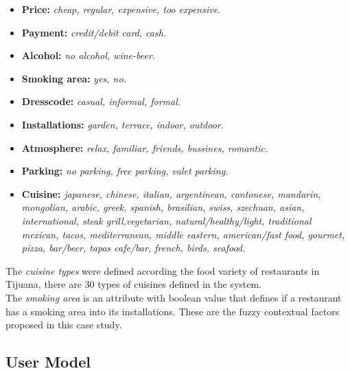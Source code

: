 \begin{itemize}
\item \textbf{Price:} \textit{cheap, regular, expensive, too expensive.}
\item \textbf{Payment:} \textit{credit/debit card, cash.}
\item \textbf{Alcohol:} \textit{no alcohol, wine-beer.}
\item \textbf{Smoking area:} \textit{yes, no.}
\item \textbf{Dresscode:} \textit{casual, informal, formal.}
\item \textbf{Installations:} \textit{garden, terrace, indoor, outdoor.}
\item \textbf{Atmosphere:} \textit{relax, familiar, friends, bussines, romantic.}
\item \textbf{Parking:} \textit{no parking, free parking, valet parking.}
\item \textbf{Cuisine:} \textit{japanese, chinese, italian, argentinean,
cantonese, mandarin, mongolian, arabic, greek, spanish, brasilian,
swiss, szechuan, asian, international, steak grill,vegetarian,
natural/healthy/light, traditional mexican, tacos, mediterranean,
middle eastern, american/fast food, gourmet, pizza, bar/beer, tapas
cafe/bar, french, birds, seafood.}
\end{itemize}
The \textit{cuisine types} were defined according the food variety 
of restaurants in Tijuana, there are 30 types of cuisines defined 
in the system. \\
The \textit{smoking area} is an attribute with boolean value that 
defines if a restaurant has a smoking area into its installations.
These are the fuzzy contextual factors proposed in this case study.

\subsection{User Model} 

